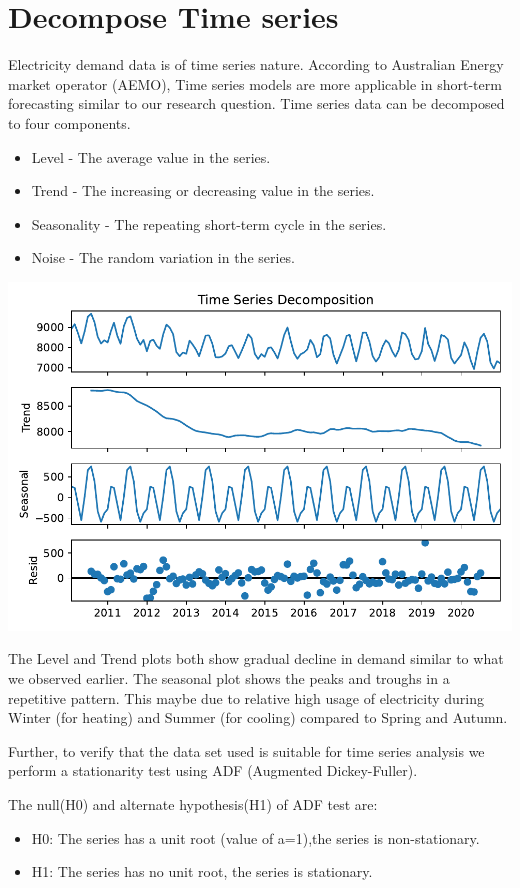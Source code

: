 \documentclass[mstat,12pt]{unswthesis}
\begin{document}
\section{Decompose Time series}\label{decompose-time-series}

Electricity demand data is of time series nature. According to
Australian Energy market operator (AEMO), Time series models are more
applicable in short-term forecasting \cite{aemo2023forecasting} similar
to our research question. Time series data can be decomposed to four
components. \cite{brownlee_2017_how}

\begin{itemize}
  \item Level - The average value in the series.
  \item Trend - The increasing or decreasing value in the series.
  \item Seasonality - The repeating short-term cycle in the series.
  \item Noise - The random variation in the series.
\end{itemize}

\begin{center}\includegraphics[width=0.5\linewidth]{unsw-ZZSC9020-report-template_files/figure-latex/unnamed-chunk-3-3} \end{center}

The Level and Trend plots both show gradual decline in demand similar to
what we observed earlier. The seasonal plot shows the peaks and troughs
in a repetitive pattern. This maybe due to relative high usage of
electricity during Winter (for heating) and Summer (for cooling)
compared to Spring and Autumn.

Further, to verify that the data set used is suitable for time series
analysis we perform a stationarity test using ADF (Augmented
Dickey-Fuller).

The null(H0) and alternate hypothesis(H1) of ADF test are:

\begin{itemize}
  \item H0: The series has a unit root (value of a=1),the series is non-stationary.
  \item H1: The series has no unit root, the series is stationary.
\end{itemize}
\end{document}
